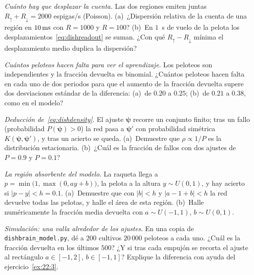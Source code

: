 \begin{exercise}[\lvlA]
\label{ex:22:1}
\emph{Cuánto hay que desplazar la cuenta.} Las dos regiones emiten juntas $R_\uparrow+R_\downarrow=2000$ espigas/s (Poisson). (a)~¿Dispersión relativa de la cuenta de una región en $10\,\text{ms}$ con $R=1000$ y $R=100$? (b)~En $1$~s de vuelo de la pelota los desplazamientos~\eqref{eq:dishreadout} se suman. ¿Con qué $R_\uparrow-R_\downarrow$ mínima el desplazamiento medio duplica la dispersión?
\end{exercise}

\begin{exercise}[\lvlA]
\label{ex:22:2}
\emph{Cuántos peloteos hacen falta para ver el aprendizaje.} Los peloteos son independientes y la fracción devuelta es binomial. ¿Cuántos peloteos hacen falta en cada uno de dos periodos para que el aumento de la fracción devuelta supere dos desviaciones estándar de la diferencia: (a)~de $0.20$ a $0.25$; (b)~de $0.21$ a $0.38$, como en el modelo?
\end{exercise}

\begin{exercise}[\lvlB]
\label{ex:22:3}
\emph{Deducción de~\eqref{eq:dishdensity}.} El ajuste $\boldsymbol\psi$ recorre un conjunto finito; tras un fallo (probabilidad $P(\boldsymbol\psi)>0$) la red pasa a $\boldsymbol\psi'$ con probabilidad simétrica $K(\boldsymbol\psi,\boldsymbol\psi')$, y tras un acierto se queda. (a)~Demuestre que $\rho\propto1/P$ es la distribución estacionaria. (b)~¿Cuál es la fracción de fallos con dos ajustes de $P=0.9$ y $P=0.1$?
\end{exercise}

\begin{exercise}[\lvlB]
\label{ex:22:4}
\emph{La región absorbente del modelo.} La raqueta llega a $p=\min\bigl(1,\max(0,ay+b)\bigr)$, la pelota a la altura $y\sim U(0,1)$, y hay acierto si $|p-y|<h=0.1$. (a)~Demuestre que con $|b|<h$ y $|a-1+b|<h$ la red devuelve todas las pelotas, y halle el área de esta región. (b)~Halle numéricamente la fracción media devuelta con $a\sim U(-1,1)$, $b\sim U(0,1)$.
\end{exercise}

\begin{exercise}[\lvlB]
\label{ex:22:5}
\emph{Simulación: una valla alrededor de los ajustes.} En una copia de \texttt{dishbrain\_model.py}, dé a $200$ cultivos $20\,000$ peloteos a cada uno. ¿Cuál es la fracción devuelta en los últimos $500$? ¿Y si tras cada empujón se recorta el ajuste al rectángulo $a\in[-1,2]$, $b\in[-1,1]$? Explique la diferencia con ayuda del ejercicio~\ref{ex:22:3}.
\end{exercise}

